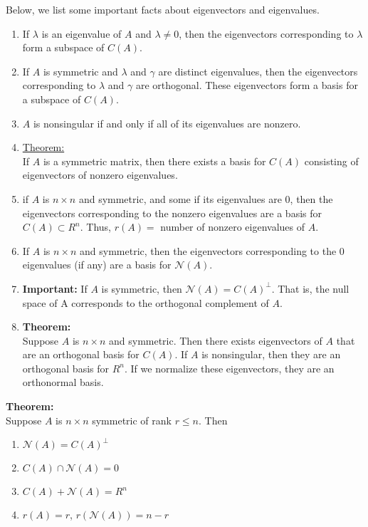 \documentclass[12pt]{article}
\numberwithin{equation}{section}
\begin{document}
Below, we list some important facts about eigenvectors and eigenvalues.
\begin{enumerate}
  \item If $\lambda$ is an eigenvalue of $A$ and $\lambda \ne 0$, then the eigenvectors corresponding to $\lambda$ form a subspace of $C(A)$.
  \item If $A$ is symmetric and $\lambda$ and $\gamma$ are distinct eigenvalues, then the eigenvectors corresponding to $\lambda$ and $\gamma$ are orthogonal. These eigenvectors form a basis for a subspace of $C(A)$.
  \item $A$ is nonsingular if and only if all of its eigenvalues are nonzero.
  \item \underline{Theorem:} \\
  If $A$ is a symmetric matrix, then there exists a basis for $C(A)$ consisting of eigenvectors of nonzero eigenvalues.
  \item if $A$ is $n \times n$ and symmetric, and some if its eigenvalues are 0, then the eigenvectors corresponding to the nonzero eigenvalues are a basis for $C(A) \subset R^n$. Thus, $r(A) =$ number of nonzero eigenvalues of $A$.
  \item If $A$ is $n \times n$ and symmetric, then the eigenvectors corresponding to the 0 eigenvalues (if any) are a basis for $\mathcal{N}(A)$.
  \item \textbf{Important:} If $A$ is symmetric, then $\mathcal{N}(A) = C(A)^{\perp}$. That is, the null space of A corresponds to the orthogonal complement of $A$.
  \item \textbf{Theorem:} \\
  Suppose $A$ is $n \times n$ and symmetric. Then there exists eigenvectors of $A$ that are an orthogonal basis for $C(A)$. If $A$ is nonsingular, then they are an orthogonal basis for $R^n$. If we normalize these eigenvectors, they are an orthonormal basis.
\end{enumerate}

\textbf{Theorem:} \\
Suppose $A$ is $n \times n$ symmetric of rank $r \le n$. Then
\begin{enumerate}
  \item $\mathcal{N}(A) = C(A)^{\perp}$
  \item $C(A) \cap \mathcal{N}(A) = 0$
  \item $C(A) + \mathcal{N}(A) = R^n$
  \item $r(A) = r$, $r(\mathcal{N}(A)) = n - r$
\end{enumerate}
\end{document}
